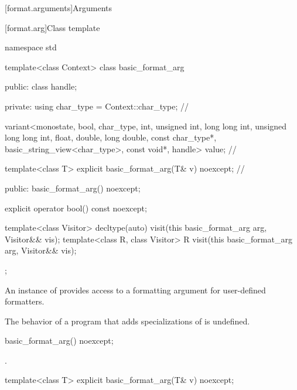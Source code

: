 [format.arguments]{Arguments}

[format.arg]{Class template }

%
\begin{codeblock}
namespace std {
  template<class Context>
  class basic_format_arg {
  public:
    class handle;

  private:
    using char_type = Context::char_type;                                       // \expos

    variant<monostate, bool, char_type,
            int, unsigned int, long long int, unsigned long long int,
            float, double, long double,
            const char_type*, basic_string_view<char_type>,
            const void*, handle> value;                                         // \expos

    template<class T> explicit basic_format_arg(T& v) noexcept;                 // \expos

  public:
    basic_format_arg() noexcept;

    explicit operator bool() const noexcept;

    template<class Visitor>
      decltype(auto) visit(this basic_format_arg arg, Visitor&& vis);
    template<class R, class Visitor>
      R visit(this basic_format_arg arg, Visitor&& vis);
  };
}
\end{codeblock}

\pnum
An instance of  provides access to
a formatting argument for user-defined formatters.

\pnum
The behavior of a program that adds specializations of
 is undefined.

%
\begin{itemdecl}
basic_format_arg() noexcept;
\end{itemdecl}

\begin{itemdescr}
\pnum
\ensures
{}.
\end{itemdescr}

\begin{itemdecl}
template<class T> explicit basic_format_arg(T& v) noexcept;
\end{itemdecl}

